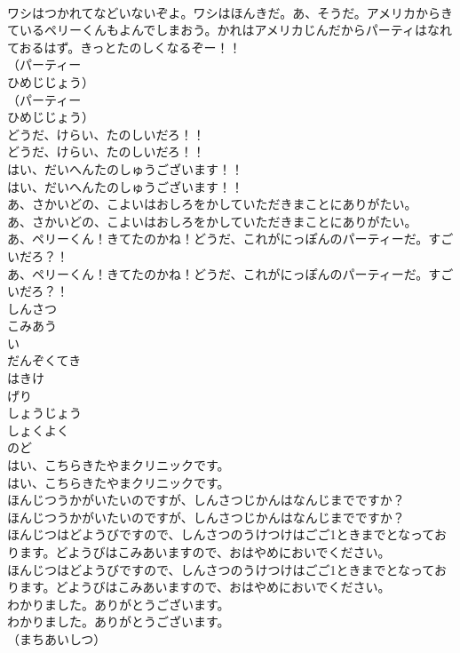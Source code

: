 \documentclass[8pt]{extreport}
\begin{document}
\begin{CJK}{UTF8}{min}
\\	ワシはつかれてなどいないぞよ。ワシはほんきだ。あ、そうだ。アメリカからきているペリーくんもよんでしまおう。かれはアメリカじんだからパーティはなれておるはず。きっとたのしくなるぞー！！
\\	（パーティー 
\\	ひめじじょう）
\\	（パーティー 
\\	ひめじじょう）
\\	どうだ、けらい、たのしいだろ！！
\\	どうだ、けらい、たのしいだろ！！
\\	はい、だいへんたのしゅうございます！！
\\	はい、だいへんたのしゅうございます！！
\\	あ、さかいどの、こよいはおしろをかしていただきまことにありがたい。
\\	あ、さかいどの、こよいはおしろをかしていただきまことにありがたい。
\\	あ、ペリーくん！きてたのかね！どうだ、これがにっぽんのパーティーだ。すごいだろ？！
\\	あ、ペリーくん！きてたのかね！どうだ、これがにっぽんのパーティーだ。すごいだろ？！
\\	しんさつ
\\	こみあう
\\	い
\\	だんぞくてき
\\	はきけ
\\	げり
\\	しょうじょう
\\	しょくよく
\\	のど
\\	はい、こちらきたやまクリニックです。
\\	はい、こちらきたやまクリニックです。
\\	ほんじつうかがいたいのですが、しんさつじかんはなんじまでですか？
\\	ほんじつうかがいたいのですが、しんさつじかんはなんじまでですか？
\\	ほんじつはどようびですので、しんさつのうけつけはごご1ときまでとなっております。どようびはこみあいますので、おはやめにおいでください。
\\	ほんじつはどようびですので、しんさつのうけつけはごご1ときまでとなっております。どようびはこみあいますので、おはやめにおいでください。
\\	わかりました。ありがとうございます。
\\	わかりました。ありがとうございます。
\\	（まちあいしつ）

\end{CJK}
\end{document}
